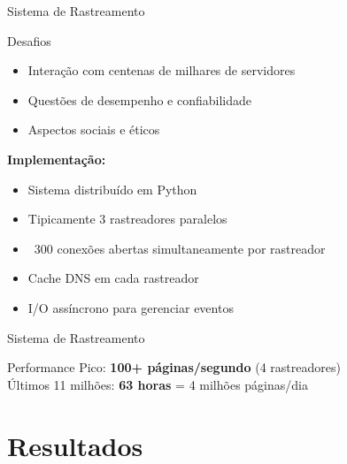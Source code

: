 \documentclass[aspectratio=169]{beamer}
\begin{document}
\begin{frame}{Sistema de Rastreamento}
\begin{block}{Desafios}
\begin{itemize}
\item Interação com centenas de milhares de servidores
\item Questões de desempenho e confiabilidade
\item Aspectos sociais e éticos
\end{itemize}
\end{block}

\vspace{0.3cm}
\textbf{Implementação:}
\begin{itemize}
\item Sistema distribuído em Python
\item Tipicamente 3 rastreadores paralelos
\item ~300 conexões abertas simultaneamente por rastreador
\item Cache DNS em cada rastreador
\item I/O assíncrono para gerenciar eventos
\end{itemize}
\end{frame}

\begin{frame}{Sistema de Rastreamento}

\vspace{0.3cm}
\begin{exampleblock}{Performance}
Pico: \textbf{100+ páginas/segundo} (4 rastreadores)\\
Últimos 11 milhões: \textbf{63 horas} = 4 milhões páginas/dia
\end{exampleblock}
\end{frame}

\section{Resultados}
\end{document}
